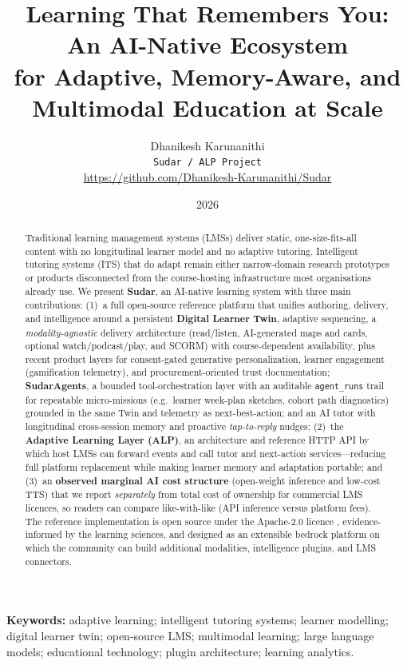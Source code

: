 \documentclass[10pt,twocolumn]{article}
\title{Learning That Remembers You: An AI-Native Ecosystem\\
for Adaptive, Memory-Aware, and Multimodal Education at Scale}
\author{
  Dhanikesh Karunanithi\\
  \texttt{Sudar / ALP Project}\\
  \url{https://github.com/Dhanikesh-Karunanithi/Sudar}
}
\date{2026}
\begin{document}
\maketitle

\begin{abstract}
Traditional learning management systems (LMSs) deliver static,
one-size-fits-all content with no longitudinal learner model and no
adaptive tutoring. Intelligent tutoring systems (ITS) that do adapt
remain either narrow-domain research prototypes or products
disconnected from the course-hosting infrastructure most organisations
already use. We present \textbf{Sudar}, an AI-native learning system
with three main contributions: (1)~a full open-source reference
platform that unifies authoring, delivery, and intelligence around a
persistent \textbf{Digital Learner Twin}, adaptive sequencing,
a \emph{modality-agnostic} delivery architecture (read/listen, AI-generated
maps and cards, optional watch/podcast/play, and SCORM) with
course-dependent availability, plus recent product layers for
consent-gated generative personalization, learner engagement
(gamification telemetry), and procurement-oriented trust documentation;
\textbf{SudarAgents}, a bounded tool-orchestration layer with an auditable
\texttt{agent\_runs} trail for repeatable micro-missions (e.g.\ learner
week-plan sketches, cohort path diagnostics) grounded in the same Twin
and telemetry as next-best-action; and an AI tutor with longitudinal cross-session memory and proactive
\emph{tap-to-reply} nudges; (2)~the \textbf{Adaptive Learning
Layer (ALP)}, an architecture and reference HTTP API by which host LMSs
can forward events and call tutor and next-action services---reducing
full platform replacement while making learner memory and adaptation
portable; and (3)~an \textbf{observed marginal AI cost structure} (open-weight
inference and low-cost TTS) that we report \emph{separately} from total
cost of ownership for commercial LMS licences, so readers can compare
like-with-like (API inference versus platform fees). The reference
implementation is open source under the Apache-2.0 licence
\cite{sudar2026}, evidence-informed by the learning sciences, and
designed as an extensible bedrock platform on which the community can
build additional modalities, intelligence plugins, and LMS connectors.
\end{abstract}

\noindent\textbf{Keywords:} adaptive learning; intelligent tutoring systems;
learner modelling; digital learner twin; open-source LMS; multimodal learning;
large language models; educational technology; plugin architecture; learning
analytics.
\end{document}
